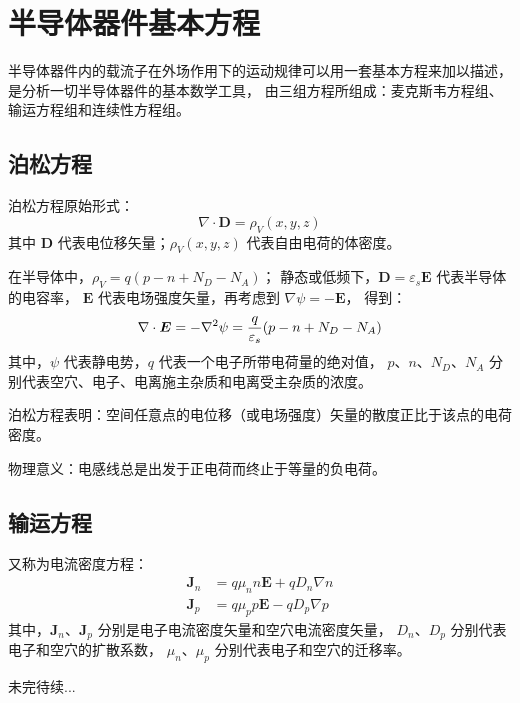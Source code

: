 \section{半导体器件基本方程}

半导体器件内的载流子在外场作用下的运动规律可以用一套基本方程来加以描述，
是分析一切半导体器件的基本数学工具，
由三组方程所组成：麦克斯韦方程组、输运方程组和连续性方程组。

\subsection{泊松方程}
泊松方程原始形式：
\begin{equation}
    \nabla \cdot \boldsymbol{D} = \rho_V(x,y,z)
\end{equation}
其中 $\boldsymbol{D}$ 代表电位移矢量；$\rho_V(x,y,z)$ 代表自由电荷的体密度。

在半导体中，$\rho_V=q(p-n+N_D-N_A)$；
静态或低频下，$\boldsymbol{D}=\varepsilon_s\boldsymbol{E}$ 代表半导体的电容率，
$\boldsymbol{E}$ 代表电场强度矢量，再考虑到 $\nabla \psi = -\boldsymbol{E}$，
得到：
\begin{equation}
    \nabla \cdot \boldsymbol{E} = -\nabla^2\psi
    = {q \over \varepsilon_s}(p-n+N_D-N_A)
\end{equation}
其中，$\psi$ 代表静电势，$q$ 代表一个电子所带电荷量的绝对值，
$p$、$n$、$N_D$、$N_A$ 分别代表空穴、电子、电离施主杂质和电离受主杂质的浓度。

泊松方程表明：空间任意点的电位移（或电场强度）矢量的散度正比于该点的电荷密度。

物理意义：电感线总是出发于正电荷而终止于等量的负电荷。

\subsection{输运方程}

又称为电流密度方程：
\begin{align}
\boldsymbol{J}_n &= q\mu_nn\boldsymbol{E} + qD_n\nabla{}n \\
\boldsymbol{J}_p &= q\mu_pp\boldsymbol{E} - qD_p\nabla{}p
\end{align}
其中，$\boldsymbol{J}_n$、$\boldsymbol{J}_p$
分别是电子电流密度矢量和空穴电流密度矢量，
$D_n$、$D_p$ 分别代表电子和空穴的扩散系数，
$\mu_n$、$\mu_p$ 分别代表电子和空穴的迁移率。

未完待续...
